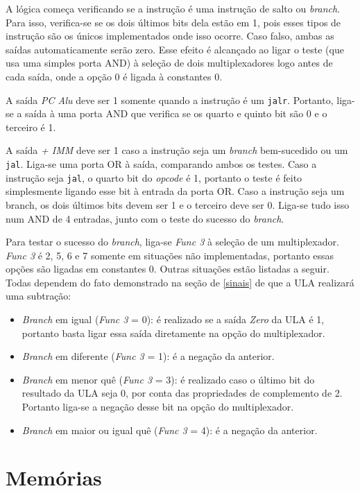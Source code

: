 \documentclass[twocolumn]{article}
\begin{document}
A lógica começa verificando se a instrução é uma instrução de salto ou
\textit{branch}. Para isso, verifica-se se os dois últimos bits dela estão em 1,
pois esses tipos de instrução são os únicos implementados onde isso
ocorre\cite{spec}. Caso falso, ambas as saídas automaticamente serão zero. Esse
efeito é alcançado ao ligar o teste (que usa uma simples porta AND) à seleção de
dois multiplexadores logo antes de cada saída, onde a opção 0 é ligada à
constantes 0.

A saída \textit{PC Alu} deve ser 1 somente quando a instrução é um
\verb|jalr|. Portanto, liga-se a saída à uma porta AND que verifica se os quarto
e quinto bit são 0 e o terceiro é 1.

A saída \textit{+ IMM} deve ser 1 caso a instrução seja um \textit{branch}
bem-sucedido ou um \verb|jal|. Liga-se uma porta OR à saída, comparando ambos os
testes. Caso a instrução seja \verb|jal|, o quarto bit do \textit{opcode} é 1,
portanto o teste é feito simplesmente ligando esse bit à entrada da porta
OR. Caso a instrução seja um branch, os dois últimos bits devem ser 1 e o
terceiro deve ser 0. Liga-se tudo isso num AND de 4 entradas, junto com o teste
do sucesso do \textit{branch}.

Para testar o sucesso do \textit{branch}, liga-se \textit{Func 3} à seleção de
um multiplexador. \textit{Func 3} é 2, 5, 6 e 7 somente em situações não
implementadas, portanto essas opções são ligadas em constantes 0. Outras
situações estão listadas a seguir. Todas dependem do fato demonstrado na seção
de \ref{sinais} de que a ULA realizará uma subtração:

\begin{itemize}
\item \textit{Branch} em igual (\textit{Func 3} = 0): é realizado se a saída
  \textit{Zero} da ULA é 1, portanto basta ligar essa saída diretamente na opção
  do multiplexador.
\item \textit{Branch} em diferente (\textit{Func 3} = 1): é a negação da
  anterior.
\item \textit{Branch} em menor quê (\textit{Func 3} = 3): é realizado caso o
  último bit do resultado da ULA seja 0, por conta das propriedades de
  complemento de 2\cite{cornell-notes}. Portanto liga-se a negação desse bit na
  opção do multiplexador.
\item \textit{Branch} em maior ou igual quê (\textit{Func 3} = 4): é a negação
  da anterior.
\end{itemize}

\section{Memórias}
\end{document}
